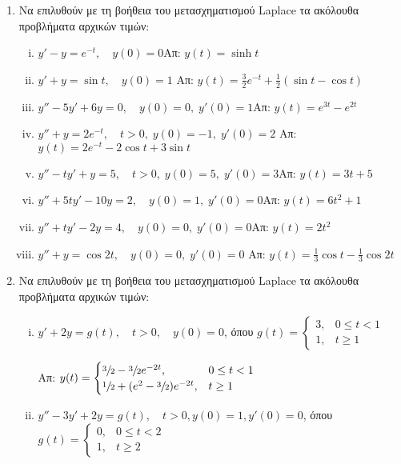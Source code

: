 \begin{enumerate}
  \item Να επιλυθούν με τη βοήθεια του μετασχηματισμού Laplace τα ακόλουθα 
    προβλήματα αρχικών τιμών:
    \begin{enumerate}[i)]
      \item $y'-y=e^{-t},\quad y(0)=0$\hfill Απ: $y(t)=\sinh t$
      \item $y'+y=\sin t,\quad y(0)=1$
        \hfill Απ: $y(t)=\frac{3}{2}e^{-t}+\frac{1}{2}(\sin t-\cos t)$
      \item $y''-5y'+6y=0,\quad y(0)=0, \; y'(0)=1$\hfill Απ: $y(t)=e^{3t}-e^{2t}$
      \item $y''+y=2e^{-t},\quad t>0, \; y(0)=-1, \; y'(0)=2$
        \hfill Απ: $y(t)=2e^{-t}-2\cos t+3\sin t$
      \item $y''-ty'+y=5, \quad t>0, \; y(0)=5, \; y'(0)=3$\hfill Απ: $y(t)=3t+5$
      \item $y'' +5ty'-10y=2, \quad y(0)=1, \; y'(0)=0$\hfill Απ: $y(t)=6t^2+1$
      \item $y'' +ty'-2y=4, \quad y(0)=0, \; y'(0)=0$\hfill Απ: $y(t)=2t^2$
      \item $y''+y =\cos 2t, \quad y(0)=0, \; y'(0)=0$ 
        \hfill Απ: $y(t)=\frac{1}{3}\cos t-\frac{1}{3}\cos 2t$
    \end{enumerate}

  \item Να επιλυθούν με τη βοήθεια του μετασχηματισμού Laplace τα ακόλουθα 
    προβλήματα αρχικών τιμών:
    \begin{enumerate}[i)]
      \item $y'+2y=g(t),\quad t>0,\quad y(0)=0$, 
        όπου $g(t)=
        \begin{cases}
          3, & 0\leq t<1 \\ 1, & t\geq 1
        \end{cases}$

        \hfill Απ: $y(t)=
        \begin{cases} 
          \sfrac{3}{2}-\sfrac{3}{2}e^{-2t},& 0\leq t<1 \\ 
          \sfrac{1}{2}+(e^2-\sfrac{3}{2})e^{-2t}, & t\geq 1
        \end{cases}$

      \item $y''-3y'+2y=g(t),\quad t>0, y(0)=1, y'(0)=0$, 
        όπου $g(t)=
        \begin{cases} 
          0, & 0\leq t<2 \\ 1, & t\geq 2
        \end{cases}$


\end{enumerate}
\end{enumerate}
